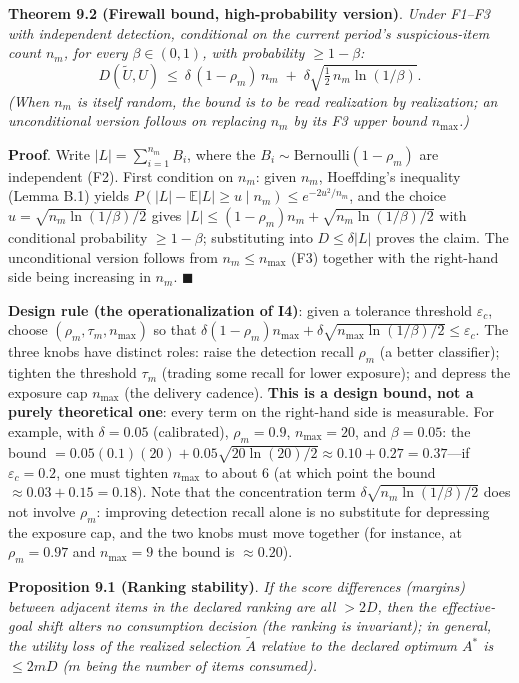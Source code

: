 \documentclass[
  11pt]{article}
\begin{document}
\textbf{Theorem 9.2 (Firewall bound, high-probability version)}.
\emph{Under F1--F3 with independent detection, conditional on the
current period's suspicious-item count \(n_m\), for every
\(\beta \in (0,1)\), with probability \(\ge 1 - \beta\):}
\[D(\tilde U, U) \ \le\ \delta\,(1-\rho_m)\,n_m \;+\; \delta\sqrt{\tfrac{1}{2}\,n_m \ln(1/\beta)}.\]
\emph{(When \(n_m\) is itself random, the bound is to be read
realization by realization; an unconditional version follows on
replacing \(n_m\) by its F3 upper bound \(n_{\max}\).)}

\textbf{Proof}. Write \(|L| = \sum_{i=1}^{n_m} B_i\), where the
\(B_i \sim \mathrm{Bernoulli}(1-\rho_m)\) are independent (F2). First
condition on \(n_m\): given \(n_m\), Hoeffding's inequality (Lemma B.1)
yields \(P(|L| - \mathbb{E}|L| \ge u \mid n_m) \le e^{-2u^2/n_m}\), and
the choice \(u = \sqrt{n_m \ln(1/\beta)/2}\) gives
\(|L| \le (1-\rho_m)n_m + \sqrt{n_m\ln(1/\beta)/2}\) with conditional
probability \(\ge 1-\beta\); substituting into \(D \le \delta|L|\)
proves the claim. The unconditional version follows from
\(n_m \le n_{\max}\) (F3) together with the right-hand side being
increasing in \(n_m\). \(\blacksquare\)

\textbf{Design rule (the operationalization of I4)}: given a tolerance
threshold \(\varepsilon_c\), choose \((\rho_m, \tau_m, n_{\max})\) so
that
\(\delta(1-\rho_m)n_{\max} + \delta\sqrt{n_{\max}\ln(1/\beta)/2} \le \varepsilon_c\).
The three knobs have distinct roles: raise the detection recall
\(\rho_m\) (a better classifier); tighten the threshold \(\tau_m\)
(trading some recall for lower exposure); and depress the exposure cap
\(n_{\max}\) (the delivery cadence). \textbf{This is a design bound, not
a purely theoretical one}: every term on the right-hand side is
measurable. For example, with \(\delta = 0.05\) (calibrated),
\(\rho_m = 0.9\), \(n_{\max} = 20\), and \(\beta = 0.05\): the bound
\(= 0.05(0.1)(20) + 0.05\sqrt{20 \ln(20)/2} \approx 0.10 + 0.27 = 0.37\)---if
\(\varepsilon_c = 0.2\), one must tighten \(n_{\max}\) to about 6 (at
which point the bound \(\approx 0.03 + 0.15 = 0.18\)). Note that the
concentration term \(\delta\sqrt{n_m\ln(1/\beta)/2}\) does not involve
\(\rho_m\): improving detection recall alone is no substitute for
depressing the exposure cap, and the two knobs must move together (for
instance, at \(\rho_m = 0.97\) and \(n_{\max} = 9\) the bound is
\(\approx 0.20\)).

\textbf{Proposition 9.1 (Ranking stability)}. \emph{If the score
differences (margins) between adjacent items in the declared ranking are
all \(> 2D\), then the effective-goal shift alters no consumption
decision (the ranking is invariant); in general, the utility loss of the
realized selection \(\tilde A\) relative to the declared optimum \(A^*\)
is \(\le 2mD\) (\(m\) being the number of items consumed).}
\end{document}
